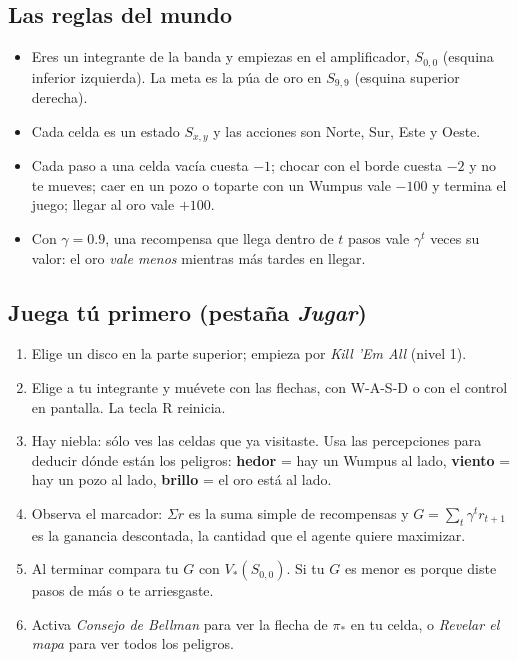 \documentclass[11pt,letterpaper]{article}
\begin{document}
\subsection{Las reglas del mundo}
\begin{itemize}[leftmargin=*]
  \item Eres un integrante de la banda y empiezas en el amplificador, $S_{0,0}$ (esquina inferior izquierda). La meta es la púa de oro en $S_{9,9}$ (esquina superior derecha).
  \item Cada celda es un estado $S_{x,y}$ y las acciones son Norte, Sur, Este y Oeste.
  \item Cada paso a una celda vacía cuesta $-1$; chocar con el borde cuesta $-2$ y no te mueves; caer en un pozo o toparte con un Wumpus vale $-100$ y termina el juego; llegar al oro vale $+100$.
  \item Con $\gamma = 0.9$, una recompensa que llega dentro de $t$ pasos vale $\gamma^t$ veces su valor: el oro \emph{vale menos} mientras más tardes en llegar.
\end{itemize}

\subsection{Juega tú primero (pestaña \emph{Jugar})}
\begin{enumerate}[leftmargin=*]
  \item Elige un disco en la parte superior; empieza por \emph{Kill 'Em All} (nivel 1).
  \item Elige a tu integrante y muévete con las flechas, con W-A-S-D o con el control en pantalla. La tecla R reinicia.
  \item Hay niebla: sólo ves las celdas que ya visitaste. Usa las percepciones para deducir dónde están los peligros: \textbf{hedor} = hay un Wumpus al lado, \textbf{viento} = hay un pozo al lado, \textbf{brillo} = el oro está al lado.
  \item Observa el marcador: $\Sigma r$ es la suma simple de recompensas y $G = \sum_t \gamma^t r_{t+1}$ es la ganancia descontada, la cantidad que el agente quiere maximizar.
  \item Al terminar compara tu $G$ con $V_*(S_{0,0})$. Si tu $G$ es menor es porque diste pasos de más o te arriesgaste.
  \item Activa \emph{Consejo de Bellman} para ver la flecha de $\pi_*$ en tu celda, o \emph{Revelar el mapa} para ver todos los peligros.
\end{enumerate}
\end{document}
